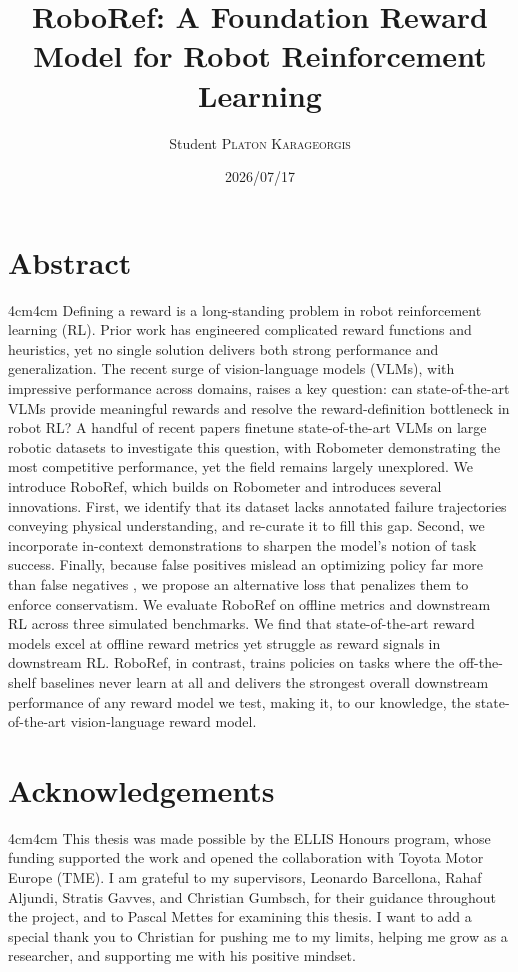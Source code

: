 \documentclass[license]{mscaithesis}  %
\title{RoboRef: A Foundation Reward Model for Robot Reinforcement Learning}
\date{2026/07/17}
\author{Student \textsc{Platon Karageorgis}}
\begin{document}
\maketitle

\frontmatter
        \chapter*{Abstract}
                \begin{adjustwidth}{4cm}{4cm}
                        Defining a reward is a long-standing problem in robot reinforcement learning (RL). Prior work has engineered complicated reward functions and heuristics, yet no single solution delivers both strong performance and generalization. The recent surge of vision-language models (VLMs), with impressive performance across domains, raises a key question: can state-of-the-art VLMs provide meaningful rewards and resolve the reward-definition bottleneck in robot RL? A handful of recent papers finetune state-of-the-art VLMs on large robotic datasets to investigate this question, with Robometer \citep{robometer} demonstrating the most competitive performance, yet the field remains largely unexplored. We introduce RoboRef, which builds on Robometer and introduces several innovations. First, we identify that its dataset lacks annotated failure trajectories conveying physical understanding, and re-curate it to fill this gap. Second, we incorporate in-context demonstrations to sharpen the model's notion of task success. Finally, because false positives mislead an optimizing policy far more than false negatives \citep{gumbsch_demonstrations_2026}, we propose an alternative loss that penalizes them to enforce conservatism. We evaluate RoboRef on offline metrics and downstream RL across three simulated benchmarks. We find that state-of-the-art reward models excel at offline reward metrics yet struggle as reward signals in downstream RL. RoboRef, in contrast, trains policies on tasks where the off-the-shelf baselines never learn at all and delivers the strongest overall downstream performance of any reward model we test, making it, to our knowledge, the state-of-the-art vision-language reward model.
                \end{adjustwidth}

\chapter*{Acknowledgements}
        \begin{adjustwidth}{4cm}{4cm}
                This thesis was made possible by the ELLIS Honours program, whose funding supported the work and opened the collaboration with Toyota Motor Europe (TME). I am grateful to my supervisors, Leonardo Barcellona, Rahaf Aljundi, Stratis Gavves, and Christian Gumbsch, for their guidance throughout the project, and to Pascal Mettes for examining this thesis. I want to add a special thank you to Christian for pushing me to my limits, helping me grow as a researcher, and supporting me with his positive mindset.
        \end{adjustwidth}
\end{document}
